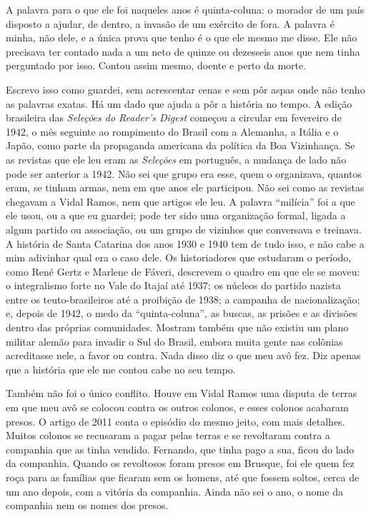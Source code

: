 \documentclass[
  brazilian,
  11pt,
  openany]{book}
\begin{document}
A palavra para o que ele foi naqueles anos é quinta-coluna: o morador de
um país disposto a ajudar, de dentro, a invasão de um exército de fora.
A palavra é minha, não dele, e a única prova que tenho é o que ele mesmo
me disse. Ele não precisava ter contado nada a um neto de quinze ou
dezesseis anos que nem tinha perguntado por isso. Contou assim mesmo,
doente e perto da morte.

Escrevo isso como guardei, sem acrescentar cenas e sem pôr aspas onde
não tenho as palavras exatas. Há um dado que ajuda a pôr a história no
tempo. A edição brasileira das \emph{Seleções do Reader's Digest}
começou a circular em fevereiro de 1942, o mês seguinte ao rompimento do
Brasil com a Alemanha, a Itália e o Japão, como parte da propaganda
americana da política da Boa Vizinhança. Se as revistas que ele leu eram
as \emph{Seleções} em português, a mudança de lado não pode ser anterior
a 1942. Não sei que grupo era esse, quem o organizava, quantos eram, se
tinham armas, nem em que anos ele participou. Não sei como as revistas
chegavam a Vidal Ramos, nem que artigos ele leu. A palavra ``milícia''
foi a que ele usou, ou a que eu guardei; pode ter sido uma organização
formal, ligada a algum partido ou associação, ou um grupo de vizinhos
que conversava e treinava. A história de Santa Catarina dos anos 1930 e
1940 tem de tudo isso, e não cabe a mim adivinhar qual era o caso dele.
Os historiadores que estudaram o período, como René Gertz e Marlene de
Fáveri, descrevem o quadro em que ele se moveu: o integralismo forte no
Vale do Itajaí até 1937; os núcleos do partido nazista entre os
teuto-brasileiros até a proibição de 1938; a campanha de nacionalização;
e, depois de 1942, o medo da ``quinta-coluna'', as buscas, as prisões e
as divisões dentro das próprias comunidades. Mostram também que não
existiu um plano militar alemão para invadir o Sul do Brasil, embora
muita gente nas colônias acreditasse nele, a favor ou contra. Nada disso
diz o que meu avô fez. Diz apenas que a história que ele me contou cabe
no seu tempo.

Também não foi o único conflito. Houve em Vidal Ramos uma disputa de
terras em que meu avô se colocou contra os outros colonos, e esses
colonos acabaram presos. O artigo de 2011 conta o episódio do mesmo
jeito, com mais detalhes. Muitos colonos se recusaram a pagar pelas
terras e se revoltaram contra a companhia que as tinha vendido.
Fernando, que tinha pago a sua, ficou do lado da companhia. Quando os
revoltosos foram presos em Brusque, foi ele quem fez roça para as
famílias que ficaram sem os homens, até que fossem soltos, cerca de um
ano depois, com a vitória da companhia. Ainda não sei o ano, o nome da
companhia nem os nomes dos presos.
\end{document}
